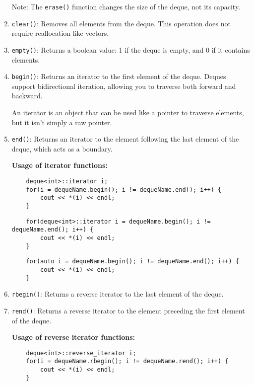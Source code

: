 \documentclass{article}
\begin{document}
\begin{enumerate}
    Note: The \texttt{erase()} function changes the size of the deque, not its capacity.

    \item \texttt{clear()}: Removes all elements from the deque. This operation does not require reallocation like vectors.
    \item \texttt{empty()}: Returns a boolean value: 1 if the deque is empty, and 0 if it contains elements.

    \item \texttt{begin()}: Returns an iterator to the first element of the deque. Deques support bidirectional iteration, allowing you to traverse both forward and backward.
    
    An iterator is an object that can be used like a pointer to traverse elements, but it isn't simply a raw pointer.
    
    \item \texttt{end()}: Returns an iterator to the element following the last element of the deque, which acts as a boundary.
    
    \textbf{Usage of iterator functions:}

    \begin{lstlisting}
    deque<int>::iterator i;
    for(i = dequeName.begin(); i != dequeName.end(); i++) {
        cout << *(i) << endl;
    }
    \end{lstlisting}

    \begin{lstlisting}
    for(deque<int>::iterator i = dequeName.begin(); i != dequeName.end(); i++) {
        cout << *(i) << endl;
    }
    \end{lstlisting}

    \begin{lstlisting}
    for(auto i = dequeName.begin(); i != dequeName.end(); i++) {
        cout << *(i) << endl;
    }
    \end{lstlisting}

    \item \texttt{rbegin()}: Returns a reverse iterator to the last element of the deque.
    \item \texttt{rend()}: Returns a reverse iterator to the element preceding the first element of the deque.
    
    \textbf{Usage of reverse iterator functions:}

    \begin{lstlisting}
    deque<int>::reverse_iterator i;
    for(i = dequeName.rbegin(); i != dequeName.rend(); i++) {
        cout << *(i) << endl;
    }
    \end{lstlisting}


\end{enumerate}
\end{document}
